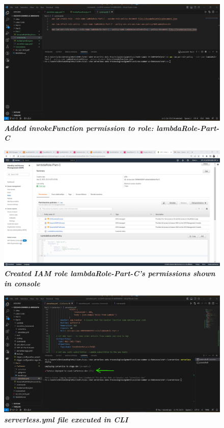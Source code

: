     \begin{figure}[htp]
        \centering
        \includegraphics[scale=1, width=15cm]{PROBLEM 3/Screenshots/1.4 added invokeFunction permission.png}
        \caption{\textbf{\textit{Added invokeFunction permission to role: lambdaRole-Part-C}}}
        \label{fig:}
    \end{figure}

    \begin{figure}[htp]
        \centering
        \includegraphics[scale=1, width=15cm]{PROBLEM 3/Screenshots/1.5 created permissions shown in console.png}
        \caption{\textbf{\textit{Created IAM role lambdaRole-Part-C's permissions shown in console}}}
        \label{fig:}
    \end{figure}

    \begin{figure}[htp]
        \centering
        \includegraphics[scale=1, width=15cm]{PROBLEM 3/Screenshots/2.1 serverless.yml file executed in cli .png}
        \caption{\textbf{\textit{serverless.yml file executed in CLI }}}
        \label{fig:}
    \end{figure}

